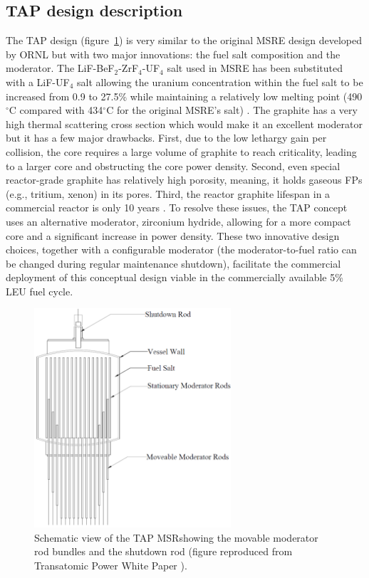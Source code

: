 \documentclass[12pt]{article} %
\begin{document}
\subsection{TAP design description}
The \gls{TAP} design (figure~\ref{fig:tap-main-view}) is very similar to the  
original \gls{MSRE} design developed by \gls{ORNL} 
\cite{haubenreich_experience_1970} but with two major innovations: 
the fuel salt composition and the moderator. The LiF-BeF$_2$-ZrF$_4$-UF$_4$ 
salt used in \gls{MSRE} has been substituted with a LiF-UF$_4$ salt allowing  
the uranium concentration within the fuel salt to be increased from 0.9 to 
27.5\% while maintaining a relatively low melting point (490$^{\circ}$C 
compared with 434$^{\circ}$C for the original \gls{MSRE}'s salt) 
\cite{betzler_two-dimensional_2017}. The graphite has a very high 
thermal scattering cross section which would make it an excellent moderator 
but it has a few major drawbacks. First, due to the low lethargy gain per 
collision, the core requires a large volume of graphite to reach criticality,  
leading to a larger core and obstructing the core power density. Second, even 
special reactor-grade graphite has relatively high porosity, meaning, it holds
gaseous \glspl{FP} (e.g., tritium, xenon) in its pores. Third, the reactor 
graphite lifespan in a commercial reactor is only 10 years 
\cite{robertson_conceptual_1971}. To resolve these issues, the \gls{TAP} 
concept uses an alternative moderator, zirconium hydride, allowing for 
a more compact core and a significant increase in power density. These two 
innovative design choices, together with a configurable moderator 
(the moderator-to-fuel ratio can be changed during regular maintenance 
shutdown), facilitate the commercial deployment of this conceptual design 
viable in the commercially available 5\% \gls{LEU} fuel cycle. 
\begin{figure}[htp!] %
  		\hspace{+1.6in}
		  \includegraphics[width=0.65\textwidth]{tap_front_view.png}
  \caption{Schematic view of the \gls{TAP} \gls{MSR}showing the movable 
  moderator rod bundles and the shutdown rod (figure reproduced from 
  Transatomic Power White Paper 
  \cite{transatomic_power_corporation_technical_2016}).}
  \label{fig:tap-main-view}
\end{figure}
\end{document}
